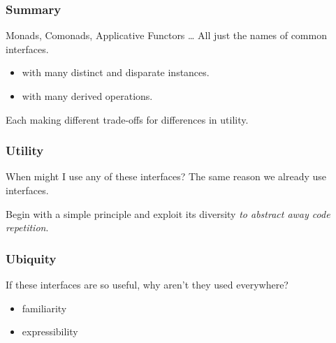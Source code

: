 \begin{frame}
\frametitle{Summary}
\begin{block}{Monads, Comonads, Applicative Functors \ldots}
All just the names of common interfaces.
\begin{itemize}
\item with many distinct and disparate instances.
\item with many derived operations.
\end{itemize}
Each making different trade-offs for differences in utility.
\end{block}
\end{frame}

\begin{frame}
\frametitle{Utility}
\begin{block}{When might I use any of these interfaces?}
The same reason we already use interfaces.
\end{block}
Begin with a simple principle and exploit its diversity \emph{to abstract away code repetition}.
\end{frame}

\begin{frame}
\frametitle{Ubiquity}
\begin{block}{If these interfaces are so useful, why aren't they used everywhere?}
\begin{itemize}
\item familiarity
\item expressibility
\end{itemize}
\end{block}
\end{frame}
